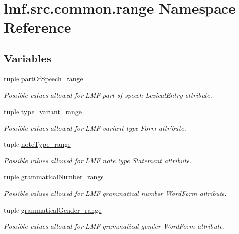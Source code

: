 \hypertarget{namespacelmf_1_1src_1_1common_1_1range}{\section{lmf.\+src.\+common.\+range Namespace Reference}
\label{namespacelmf_1_1src_1_1common_1_1range}
}
\subsection*{Variables}
\begin{DoxyCompactItemize}
\item 
tuple \hyperlink{namespacelmf_1_1src_1_1common_1_1range_a06c6dcbacac56dba9aaf04fa02b528e1}{part\+Of\+Speech\+\_\+range}
\begin{DoxyCompactList}\small\item\em Possible values allowed for L\+M\+F part of speech Lexical\+Entry attribute. \end{DoxyCompactList}\item 
tuple \hyperlink{namespacelmf_1_1src_1_1common_1_1range_a58f5cff733c3b357e42d3ce87c7080a0}{type\+\_\+variant\+\_\+range}
\begin{DoxyCompactList}\small\item\em Possible values allowed for L\+M\+F variant type Form attribute. \end{DoxyCompactList}\item 
tuple \hyperlink{namespacelmf_1_1src_1_1common_1_1range_a042b6a6bbc9e29deed31854fb1767b88}{note\+Type\+\_\+range}
\begin{DoxyCompactList}\small\item\em Possible values allowed for L\+M\+F note type Statement attribute. \end{DoxyCompactList}\item 
tuple \hyperlink{namespacelmf_1_1src_1_1common_1_1range_ae3353d03f04380d7379bd193af24a1ad}{grammatical\+Number\+\_\+range}
\begin{DoxyCompactList}\small\item\em Possible values allowed for L\+M\+F grammatical number Word\+Form attribute. \end{DoxyCompactList}\item 
tuple \hyperlink{namespacelmf_1_1src_1_1common_1_1range_ad872b4a301271d86df2980b34e15ffc4}{grammatical\+Gender\+\_\+range}
\begin{DoxyCompactList}\small\item\em Possible values allowed for L\+M\+F grammatical gender Word\+Form attribute. \end{DoxyCompactList}\item 

\end{DoxyCompactItemize}
